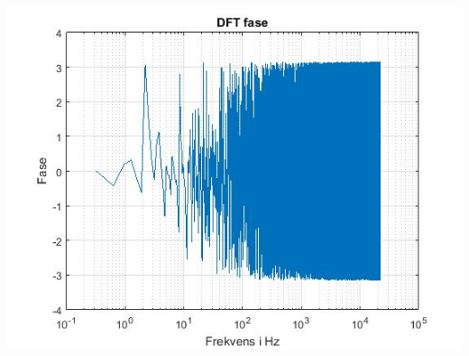 \documentclass[12pt, letterpaper]{article}
\begin{document}
\begin{figure}[!h]
           \begin{floatrow}
                  
            
           \end{floatrow}
\end{figure}





\begin{center}
\includegraphics[width=1.155\linewidth]{billeder/fasebilmotor}
\end{center}
\end{document}

